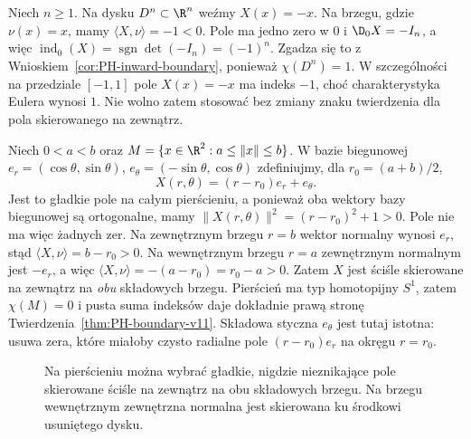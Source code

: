 \begin{przyklad}
\label{prz:PH-inward-ball}
Niech $n\ge1$. Na dysku $D^n\subset\R^n$ weźmy
$X(x)=-x$. Na brzegu, gdzie $\nu(x)=x$,
mamy $\langle X,\nu\rangle=-1<0$.
Pole ma jedno zero w $0$ i
$\D_0X=-I_n$, a więc
$\operatorname{ind}_0(X)=\operatorname{sgn}\det(-I_n)
=(-1)^n$.
Zgadza się to z Wnioskiem~\ref{cor:PH-inward-boundary},
ponieważ $\chi(D^n)=1$.
W szczególności na przedziale $[-1,1]$
pole $X(x)=-x$ ma indeks $-1$,
choć charakterystyka Eulera wynosi $1$.
Nie wolno zatem stosować bez zmiany znaku
twierdzenia dla pola skierowanego na zewnątrz.
\end{przyklad}

\begin{przyklad}
\label{prz:PH-annulus-nozeros}
Niech $0<a<b$ oraz
$M=\{x\in\R^2:a\le\|x\|\le b\}$.
W bazie biegunowej
$e_r=(\cos\theta,\sin\theta)$,
$e_\theta=(-\sin\theta,\cos\theta)$
zdefiniujmy, dla $r_0=(a+b)/2$,
\[
 X(r,\theta)=(r-r_0)e_r+e_\theta.
\]
Jest to gładkie pole na całym pierścieniu,
a ponieważ oba wektory bazy biegunowej są
ortogonalne, mamy
$\|X(r,\theta)\|^2=(r-r_0)^2+1>0$.
Pole nie ma więc żadnych zer.
Na zewnętrznym brzegu $r=b$ wektor
normalny wynosi $e_r$, stąd
$\langle X,\nu\rangle=b-r_0>0$.
Na wewnętrznym brzegu $r=a$
zewnętrznym normalnym jest \emph{$-e_r$},
a więc
$\langle X,\nu\rangle=-(a-r_0)=r_0-a>0$.
Zatem $X$ jest ściśle skierowane na zewnątrz
na \emph{obu} składowych brzegu.
Pierścień ma typ homotopijny $S^1$,
zatem $\chi(M)=0$ i pusta suma indeksów
daje dokładnie prawą stronę
Twierdzenia~\ref{thm:PH-boundary-v11}.
Składowa styczna $e_\theta$ jest tutaj istotna:
usuwa zera, które miałoby czysto radialne
pole $(r-r_0)e_r$ na okręgu $r=r_0$.
\end{przyklad}

\begin{figure}[!htbp]
\centering
{}
\caption{Na pierścieniu można wybrać gładkie,
nigdzie nieznikające pole skierowane ściśle na
zewnątrz na obu składowych brzegu.
Na brzegu wewnętrznym zewnętrzna normalna
jest skierowana ku środkowi usuniętego dysku.}
\label{fig:PH-annulus-field}
\end{figure}

